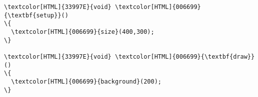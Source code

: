 \begin{Verbatim}[commandchars=\\\{\}]
\textcolor[HTML]{33997E}{void} \textcolor[HTML]{006699}{\textbf{setup}}()
\{
  \textcolor[HTML]{006699}{size}(400,300);
\}

\textcolor[HTML]{33997E}{void} \textcolor[HTML]{006699}{\textbf{draw}}()
\{
  \textcolor[HTML]{006699}{background}(200);
\}
\end{Verbatim}
